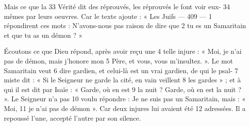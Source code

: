 Mais ce que la	 
33	 	Vérité dit des réprouvés, les réprouvés le font voir eux-	 
34	 	mêmes par leurs oeuvres. Car le texte ajoute : « Les Juifs	 
 	--- 409 ---	 
1	 	répondirent ces mots : N'avons-nous pas raison de dire que	 
2	 	tu es un Samaritain et que tu as un démon ? »

Écoutons ce que Dieu répond, après avoir reçu une	 
4	 	telle injure : « Moi, je n'ai pas de démon, mais j'honore mon	 
5	 	Père, et vous, vous m'insultez. ». Le mot Samaritain veut	 
6	 	dire gardien, et celui-là est un vrai gardien, de qui le psal-	 
7	 	miste dit : « Si le Seigneur ne garde la cité, en vain veillent	 
8	 	les gardes » ; et à qui il est dit par Isaïe : « Garde, où en est	 
9	 	la nuit ? Garde, où en est la nuit ? ». Le Seigneur n'a pas	 
10	 	voulu répondre : Je ne suis pas un Samaritain, mais : « Moi,	 
11	 	je n'ai pas de démon ». Car deux injures lui avaient été	 
12	 	adressées. Il a repoussé l'une, accepté l'autre par son silence.